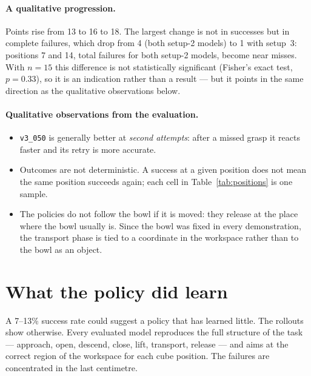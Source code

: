 \documentclass[11pt,a4paper]{article}
\begin{document}
\paragraph{A qualitative progression.} Points rise from 13 to 16 to 18. The
largest change is not in successes but in complete failures, which drop from 4
(both setup-2 models) to 1 with setup~3: positions 7 and 14, total failures
for both setup-2 models, become near misses. With $n=15$ this difference is
not statistically significant (Fisher's exact test, $p=0.33$), so it is an
indication rather than a result --- but it points in the same direction as
the qualitative observations below.

\paragraph{Qualitative observations from the evaluation.}
\begin{itemize}
  \item \texttt{v3\_050} is generally better at \emph{second attempts}: after a
        missed grasp it reacts faster and its retry is more accurate.
  \item Outcomes are not deterministic. A success at a given position does not
        mean the same position succeeds again; each cell in
        Table~\ref{tab:positions} is one sample.
  \item The policies do not follow the bowl if it is moved: they release at the
        place where the bowl usually is. Since the bowl was fixed in every
        demonstration, the transport phase is tied to a coordinate in the
        workspace rather than to the bowl as an object.
\end{itemize}

\section{What the policy did learn}
\label{sec:learned}

A 7--13\% success rate could suggest a policy that has learned little. The
rollouts show otherwise. Every evaluated model reproduces the full structure of
the task --- approach, open, descend, close, lift, transport, release --- and
aims at the correct region of the workspace for each cube position. The
failures are concentrated in the last centimetre.
\end{document}
